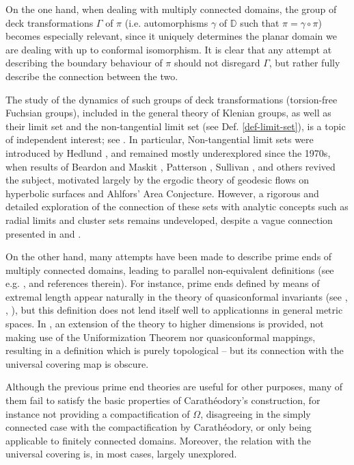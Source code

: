 \documentclass[11pt,a4paper,reqno]{amsart}
\theoremstyle{plain}
\theoremstyle{definition}
\theoremstyle{plain}
\begin{document}
On the one hand, when dealing with multiply connected domains, the group of deck transformations $ \Gamma $ of $ \pi  $ (i.e. automorphisms $ \gamma $ of $ \mathbb{D} $ such that $ \pi  =\gamma\circ\pi$) becomes especially relevant, since it  uniquely determines the planar domain we are dealing with up to conformal isomorphism. It is clear that any attempt at describing the boundary behaviour of $ \pi $ should not disregard  $ \Gamma $, but rather fully describe the connection between the two.

The study of the dynamics of such groups of deck transformations (torsion-free Fuchsian groups), included in the general theory of Klenian groups, as well as their limit set and the non-tangential limit set (see Def. \ref{def-limit-set}), is a topic of independent interest; see \cite{Kat92,MT98}. In particular, Non-tangential limit sets  were introduced by Hedlund \cite{Hed36}, and remained mostly underexplored since the 1970s, when results of Beardon and Maskit \cite{BM74}, Patterson \cite{Pat76}, Sullivan \cite{Sul79},  and others revived the subject, motivated largely by the ergodic theory of geodesic flows on hyperbolic surfaces and Ahlfors' Area Conjecture. However, a rigorous and detailed exploration of the connection of these sets with analytic concepts such as radial limits and cluster sets remains undeveloped, despite a vague connection presented in \cite{FM95} and \cite{BJ97}.  

On the other hand, many attempts have been made to describe prime ends of multiply connected domains, leading to parallel non-equivalent definitions (see e.g.  \cite{Kaufmann,Ahlfors-conformal-invariants,Nakki,suita, Epstein,prime-ends-metric-spaces}, and references therein). For instance, prime ends defined by means of extremal length appear naturally in the theory of quasiconformal invariants (see \cite{suita}, \cite{Nakki}, \cite[Sect. 4.6]{Ahlfors-conformal-invariants}), but this definition does not lend itself well to applicationns in general metric spaces. In \cite{Epstein}, an extension of the theory to higher dimensions is provided, not making use of the Uniformization Theorem nor quasiconformal mappings, resulting in a definition which is purely topological -- but its connection with the universal covering map is obscure. 

Although the previous prime end theories are useful for other purposes, many of them fail to satisfy the basic properties of Carathéodory's construction, for instance not providing a compactification of $ \Omega $, disagreeing in the simply connected case with the compactification by Carathéodory, or only being applicable to finitely connected domains. Moreover, the relation with the universal covering is, in most cases, largely unexplored.
\end{document}
